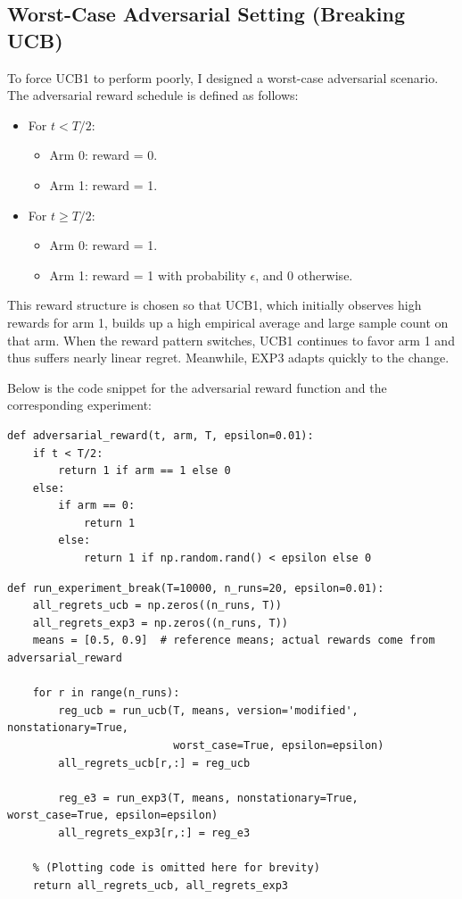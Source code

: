 \subsection*{Worst-Case Adversarial Setting (Breaking UCB)}

To force UCB1 to perform poorly, I designed a worst-case adversarial scenario. The adversarial reward schedule is defined as follows:
\begin{itemize}
    \item For $t < T/2$:
    \begin{itemize}
       \item Arm 0: reward = 0.
       \item Arm 1: reward = 1.
    \end{itemize}
    \item For $t \ge T/2$:
    \begin{itemize}
       \item Arm 0: reward = 1.
       \item Arm 1: reward = 1 with probability $\epsilon$, and 0 otherwise.
    \end{itemize}
\end{itemize}
This reward structure is chosen so that UCB1, which initially observes high rewards for arm 1, builds up a high empirical average and large sample count on that arm. When the reward pattern switches, UCB1 continues to favor arm 1 and thus suffers nearly linear regret. Meanwhile, EXP3 adapts quickly to the change.

Below is the code snippet for the adversarial reward function and the corresponding experiment:

\begin{lstlisting}
def adversarial_reward(t, arm, T, epsilon=0.01):
    if t < T/2:
        return 1 if arm == 1 else 0
    else:
        if arm == 0:
            return 1
        else:
            return 1 if np.random.rand() < epsilon else 0
\end{lstlisting}

\begin{lstlisting}
def run_experiment_break(T=10000, n_runs=20, epsilon=0.01):
    all_regrets_ucb = np.zeros((n_runs, T))
    all_regrets_exp3 = np.zeros((n_runs, T))
    means = [0.5, 0.9]  # reference means; actual rewards come from adversarial_reward
    
    for r in range(n_runs):
        reg_ucb = run_ucb(T, means, version='modified', nonstationary=True,
                          worst_case=True, epsilon=epsilon)
        all_regrets_ucb[r,:] = reg_ucb
        
        reg_e3 = run_exp3(T, means, nonstationary=True, worst_case=True, epsilon=epsilon)
        all_regrets_exp3[r,:] = reg_e3

    % (Plotting code is omitted here for brevity)
    return all_regrets_ucb, all_regrets_exp3
\end{lstlisting}


